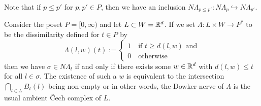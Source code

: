 Note that if $p\leq p'$ for $p,p'\in P$, then we have an inclusion $N\Lambda_{p\leq p'}\colon N\Lambda_p\hookrightarrow N\Lambda_{p'}$.

\begin{ex}
	Consider the poset $P=[0,\infty)$ and let $L\subset W=\mathbb{R}^d$. If we set $\Lambda\colon L\times W\to P^*$ to be the dissimilarity defined for $t\in P$ by 
	$$
	\Lambda(l,w)(t) := \begin{cases}
		1\quad\text{if }t\geq d(l,w) \text{ and}\\
		0\quad\text{otherwise}
	\end{cases}
	$$
	then we have $\sigma\in N\Lambda_t$ if and only if there exists some $w\in\mathbb{R}^d$ with $d(l,w)\leq t$ for all $l\in\sigma$. The existence of such a $w$ is equivalent to the intersection $\bigcap_{l\in L}B_t(l)$ being non-empty or in other words, the Dowker nerve of $\Lambda$ is the usual ambient Čech complex of $L$.
\end{ex}


